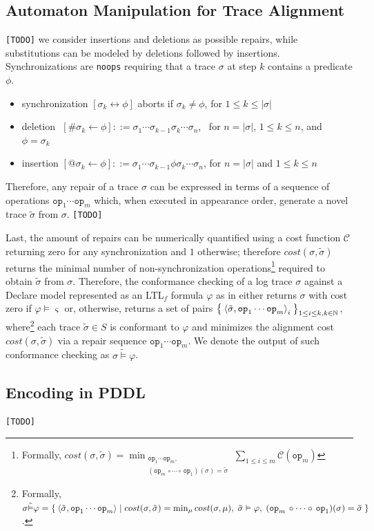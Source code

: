 \subsection{Automaton Manipulation for Trace Alignment}\label{ssec:amfta}

\texttt{\color{red}[TODO]} we consider insertions and deletions as possible repairs, while substitutions can be modeled by deletions followed by insertions. Synchronizations are \texttt{noops} requiring that a trace $\sigma$ at step $k$ contains a predicate $\phi$. 
\begin{itemize}
	\item synchronization $[\sigma_k\leftrightarrow \phi]$ aborts if $\sigma_k\neq\phi$, for  $1\leq k\leq |\sigma|$
	\item deletion\,\, $[\#\sigma_k\leftarrow \phi]::= \sigma_1\cdots\sigma_{k-1}\sigma_{k}\cdots \sigma_n$,\,\,\, for $n=|\sigma|$, $1\leq k\leq n$, and $\phi=\sigma_k$
	\item insertion $[@\sigma_k\leftarrow \phi]::= \sigma_1\cdots\sigma_{k-1}\phi\sigma_{k}\cdots \sigma_n$, for $n=|\sigma|$ and $1\leq k\leq n$
\end{itemize}
Therefore, any repair  of a trace $\sigma$ can be expressed in terms of a sequence of operations $\texttt{op}_1\cdots \texttt{op}_m$ which, when executed in appearance order, generate a novel trace $\tilde{\sigma}$ from $\sigma$.  \texttt{\color{red}[TODO]}


Last, the amount of repairs can be numerically quantified using a cost function $\mathcal{C}$ returning zero for any synchronization and $1$ otherwise; therefore $cost(\sigma, \tilde{\sigma})$ returns the minimal number of non-synchronization operations\footnote{Formally, $cost(\sigma,\tilde{\sigma})=\min_{\substack{\texttt{op}_1\cdots \texttt{op}_m,\\(\texttt{op}_m\,\circ \cdots\circ\, \texttt{op}_1)(\sigma)=\tilde{\sigma}}}\sum_{1\leq i\leq m}\mathcal{C}(\texttt{op}_m)$} required to obtain $\tilde{\sigma}$ from $\sigma$. Therefore, the conformance checking of a log trace $\sigma$ against a  Declare model represented as an LTL$_f$ formula $\varphi$ as in \cite{XuLZ17a} either returns $\sigma$ with cost zero if $\varphi\vDash\varsigma$ or, otherwise, returns a set of pairs $\Set{\braket{\tilde{\sigma},\texttt{op}_1\cdots\texttt{op}_m}_i}_{1\leq i\leq k, k\in\mathbb{N}}$, where\footnote{Formally, $\sigma\tilde{\vDash}\varphi = \Set{\braket{\tilde{\sigma},\texttt{op}_1\cdots\texttt{op}_m} | cost(\sigma,\tilde{\sigma}) = \min_\mu cost(\sigma,\mu),\;\tilde{\sigma}\vDash\varphi,\; (\texttt{op}_m\,\circ \cdots\circ\, \texttt{op}_1)(\sigma)=\tilde{\sigma}}$.} each trace $\tilde{\sigma}\in S$ is conformant to $\varphi$ and minimizes the alignment cost $cost(\sigma,\tilde{\sigma})$ via a repair sequence $\texttt{op}_1\cdots\texttt{op}_m$. We denote the output of such conformance checking as $\sigma\tilde{\vDash}\varphi$. 


\subsection{Encoding in PDDL}\label{ssec:eip}
\texttt{\color{red}[TODO]}
